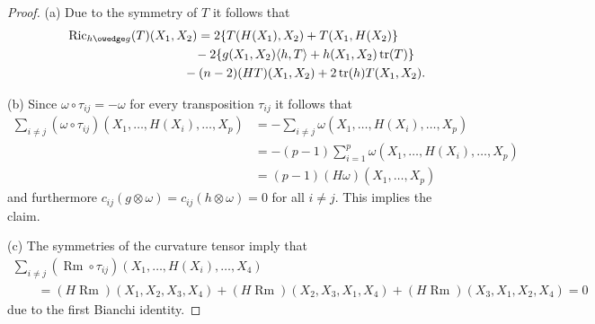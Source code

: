 \documentclass[pdftex]{sigma}
\numberwithin{equation}{section}
\newcommand{\Ric} {\operatorname{Ric}}
\newcommand{ \tr } {\operatorname{tr}}
\newcommand{\Rm} {\operatorname{Rm}}
\begin{document}
\begin{proof}
(a) Due to the symmetry of $T$ it follows that
\begin{gather*}
\Ric_{h \owedge g}(T)(X_1,X_2) =   2 \lbrace T(H(X_1), X_2) + T(X_1, H(X_2) \rbrace \\
\hphantom{\Ric_{h \owedge g}(T)(X_1,X_2) =}{} - 2 \lbrace g(X_1, X_2) \langle h, T \rangle + h(X_1, X_2) \tr(T) \rbrace \\
\hphantom{\Ric_{h \owedge g}(T)(X_1,X_2) =}{} - (n-2) (HT)(X_1, X_2) + 2 \tr(h) T(X_1, X_2).
\end{gather*}

(b) Since $\omega \circ \tau_{ij} = - \omega$ for every transposition $\tau_{ij}$ it follows that
\begin{align*}
\sum_{i \neq j} (\omega \circ \tau_{ij})(X_1, \dots, H(X_i), \dots, X_p)& =
  - \sum_{i \neq j} \omega(X_1, \dots, H(X_i), \dots, X_p) \\
& =   - (p-1) \sum_{i=1}^p \omega(X_1, \dots, H(X_i), \dots, X_p) \\
& =   (p-1) (H \omega)(X_1, \dots, X_p)
\end{align*}
and furthermore $c_{ij}(g \otimes \omega) = c_{ij}(h \otimes \omega)=0$ for all $i \neq j$. This implies the claim.

(c) The symmetries of the curvature tensor imply that
\begin{gather*}
  \sum_{i \neq j} ( \Rm \circ \tau_{ij} )(X_1, \dots, H(X_i), \dots, X_4)   \\
\!\!\qquad{}= (H \Rm)(X_1, X_2, X_3, X_4) + (H \Rm)( X_2, X_3, X_1, X_4) + (H \Rm)( X_3, X_1, X_2, X_4)=0
\end{gather*}
due to the first Bianchi identity.


\end{proof}
\end{document}
